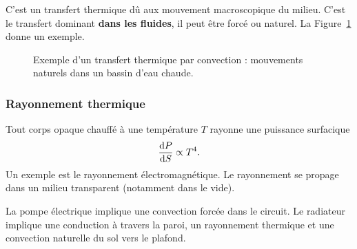             C'est un transfert thermique dû aux mouvement macroscopique du milieu. C'est le transfert dominant \textbf{dans les fluides}, il peut être forcé ou naturel. La Figure~\ref{fig:exemple_transfert_thermique_convection} donne un exemple.

            \begin{figure}
                \centering
                \caption[Exemple d'un transfert thermique par convection.]{Exemple d'un transfert thermique par convection : mouvements naturels dans un bassin d'eau chaude.}
                \label{fig:exemple_transfert_thermique_convection}
            \end{figure}

        \subsubsection{Rayonnement thermique}

            Tout corps opaque chauffé à une température $T$ rayonne une puissance surfacique
            \begin{equation*}
                \frac{\mathrm{d} P}{\mathrm{d} S}\propto T^{4}.
            \end{equation*}
            Un exemple est le rayonnement électromagnétique. Le rayonnement se propage dans un milieu transparent (notamment dans le vide).

        \begin{example}
            La pompe électrique implique une convection forcée dans le circuit. Le radiateur implique une conduction à travers la paroi, un rayonnement thermique et une convection naturelle du sol vers le plafond.
        \end{example}

